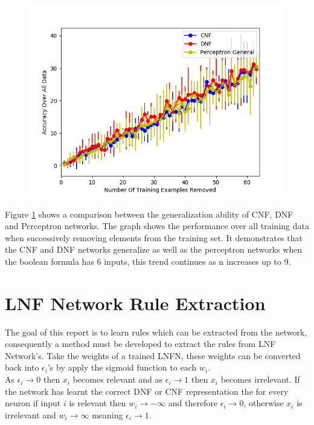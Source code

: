 \begin{figure}[H]
	\centering
	\begin{minipage}[b]{0.8\textwidth}
		\includegraphics[width=\textwidth]{6-generalization.png}
		\caption{}
		\label{fig:generalization-peformance-6}
	\end{minipage}
	\hfill
\end{figure}

Figure \ref{fig:generalization-peformance-6} shows a comparison between the generalization ability of CNF, DNF and Perceptron networks. The graph shows the performance over all training data when successively removing elements from the training set. It demonstrates that the CNF and DNF networks generalize as well as the perceptron networks when the boolean formula has 6 inputs, this trend continues as n increases up to 9.

\section{LNF Network Rule Extraction}
The goal of this report is to learn rules which can be extracted from the network, consequently a method must be developed to extract the rules from LNF Network's. Take the weights of a trained LNFN, these weights can be converted back into $\epsilon_i$'s by apply the sigmoid function to each $w_i$.\\

As $\epsilon_i \rightarrow 0$ then $x_i$ becomes relevant and as $\epsilon_i \rightarrow 1$ then $x_i$ becomes irrelevant. If the network has learnt the correct DNF or CNF representation the for every neuron if input $i$ is relevant then $w_i \rightarrow -\infty$ and therefore $\epsilon_i \rightarrow 0$, otherwise $x_i$ is irrelevant and  $w_i \rightarrow \infty$ meaning $\epsilon_i \rightarrow 1$.\\

